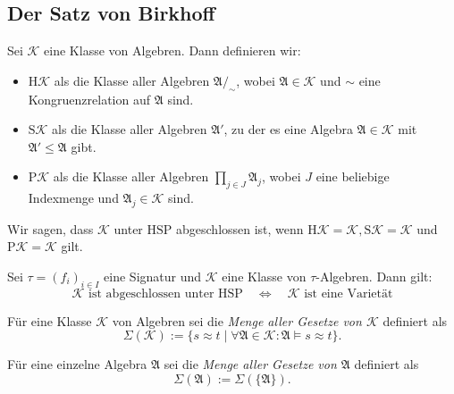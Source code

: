 
\subsection{Der Satz von Birkhoff}

\begin{samepage}    
\begin{definition}
    Sei $\mathcal{K}$ eine Klasse von Algebren. Dann definieren wir:
    \begin{itemize}
        \item $\mathrm{H}\mathcal{K}$ als die Klasse aller Algebren $\mathfrak{A /_\sim}$, wobei $\mathfrak{A} \in \mathcal{K}$ und $\sim$ eine Kongruenzrelation auf $\mathfrak{A}$ sind.
        \item $\mathrm{S}\mathcal{K}$ als die Klasse aller Algebren $\mathfrak{A}'$, zu der es eine Algebra $\mathfrak{A} \in \mathcal{K}$ mit $\mathfrak{A}' \leq \mathfrak{A}$ gibt.
        \item $\mathrm{P}\mathcal{K}$ als die Klasse aller Algebren $\prod_{j \in J} \mathfrak{A}_j$, wobei $J$ eine beliebige Indexmenge und $\mathfrak{A}_j \in \mathcal{K}$ sind.
    \end{itemize}
    Wir sagen, dass $\mathcal{K}$ unter $\mathrm{HSP}$ abgeschlossen ist, wenn $\mathrm{H}\mathcal{K} = \mathcal{K}, \mathrm{S}\mathcal{K} = \mathcal{K}$ und $\mathrm{P}\mathcal{K} = \mathcal{K}$ gilt.
\end{definition}
\end{samepage}

\begin{theorem}[Birkhoff]
    Sei $\tau=(f_i)_{i\in I}$ eine Signatur und $\mathcal{K}$ eine Klasse von $\tau$-Algebren. Dann gilt:
    \[\mathcal{K} \text{ ist abgeschlossen unter } \mathrm{HSP} \quad \Leftrightarrow \quad \mathcal{K} \text{ ist eine Varietät} \]
\end{theorem}

\begin{definition}
    Für eine Klasse $\mathcal{K}$ von Algebren sei die \emph{Menge aller Gesetze von $\mathcal{K}$} definiert als
    $$\Sigma(\mathcal{K}):=\{s\approx t\mid \forall \mathfrak{A}\in\mathcal{K}:\mathfrak{A}\models s\approx t\}.$$

    Für eine einzelne Algebra $\mathfrak{A}$ sei die \emph{Menge aller Gesetze von $\mathfrak{A}$} definiert als 
    $$\Sigma(\mathfrak{A}) := \Sigma(\{\mathfrak{A}\}).$$ 
\end{definition}

